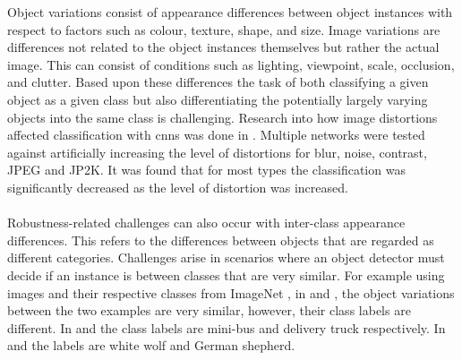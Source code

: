 Object variations consist of appearance differences between object instances with respect to factors such as colour, texture, shape, and size. Image variations are differences not related to the object instances themselves but rather the actual image. This can consist of conditions such as lighting, viewpoint, scale, occlusion, and clutter. Based upon these differences the task of both classifying a given object as a given class but also differentiating the potentially largely varying objects into the same class is challenging. Research into how image distortions affected classification with \glspl{cnn} was done in \cite{iqDNN}. Multiple networks were tested against artificially increasing the level of distortions for blur, noise, contrast, JPEG and JP2K. It was found that for most types the classification was significantly decreased as the level of distortion was increased.
\\\\
Robustness-related challenges can also occur with inter-class appearance differences. This refers to the differences between objects that are regarded as different categories. Challenges arise in scenarios where an object detector must decide if an instance is between classes that are very similar. For example using images and their respective classes from ImageNet \cite{imagenet}, in  and , the object variations between the two examples are very similar, however, their class labels are different. In  and  the class labels are mini-bus and delivery truck respectively. In  and  the labels are white wolf and German shepherd. 

